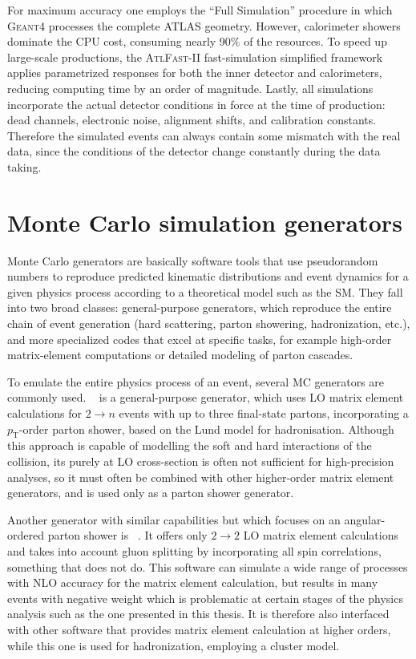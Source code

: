 For maximum accuracy one employs the “Full Simulation” procedure in which \textsc{Geant4} processes the complete ATLAS geometry.  However, calorimeter showers dominate the CPU cost, consuming nearly 90\% of the resources.  To speed up large-scale productions, the \textsc{AtlFast-II} fast-simulation simplified framework~\cite{Edmonds:1091969,ATLAS:1300517} applies parametrized responses for both the inner detector and calorimeters, reducing computing time by an order of magnitude.  Lastly, all simulations incorporate the actual detector conditions in force at the time of production: dead channels, electronic noise, alignment shifts, and calibration constants. Therefore the simulated events can always contain some mismatch with the real data, since the conditions of the detector change constantly during the data taking.


\section{Monte Carlo simulation generators}
\label{sec:mc}
Monte Carlo generators are basically software tools that use pseudorandom numbers to reproduce predicted kinematic distributions and event dynamics for a given physics process according to a theoretical model such as the SM.  They fall into two broad classes: general-purpose generators, which reproduce the entire chain of event generation (hard scattering, parton showering, hadronization, etc.), and more specialized codes that excel at specific tasks, for example high-order matrix-element computations or detailed modeling of parton cascades.

To emulate the entire physics process of an event, several MC generators are commonly used. \pythia~\cite{SJOSTRAND2015159} is a general-purpose generator, which uses LO matrix element calculations for $2 \rightarrow n$ events with up to three final-state partons, incorporating a $p_{\text{T}}$-order parton shower, based on the Lund model for hadronisation. Although this approach is capable of modelling the soft and hard interactions of the collision, its purely at LO cross-section is often not sufficient for high-precision analyses, so it must often be combined with other higher-order matrix element generators, and is used only as a parton shower generator.

Another generator with similar capabilities but which focuses on an angular-ordered parton shower is \herwig~\cite{B_hr_2008}. It offers only $2 \rightarrow 2$ LO matrix element calculations and takes into account gluon splitting by incorporating all spin correlations, something that \pythia does not do. This software can simulate 
a wide range of processes with NLO accuracy for the matrix element calculation, but results in many events with negative weight which is problematic at certain stages of the physics analysis such as the one presented in this thesis. It is therefore also interfaced with other software that provides matrix element calculation at higher orders, while this one is used for hadronization, employing a cluster model.

